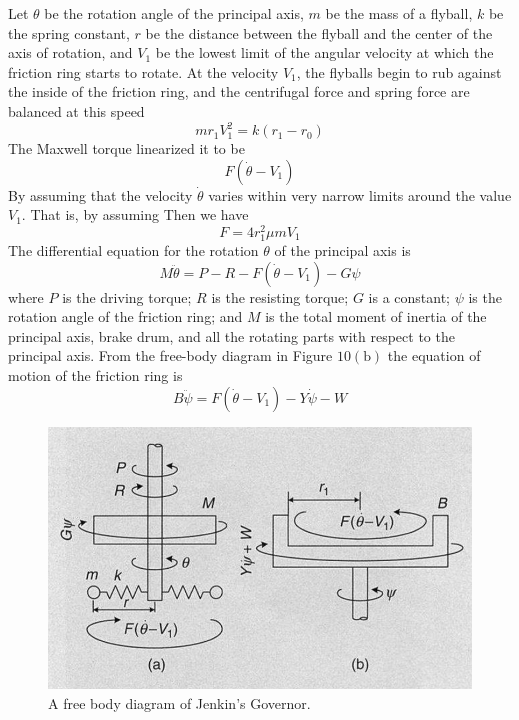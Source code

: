 \documentclass[11pt]{scrartcl} %
\begin{document}
Let $\theta$ be the rotation angle of the principal axis, $m$ be the mass of a flyball, $k$ be the spring constant, $r$ be the distance between the flyball and the center of the axis of rotation, and $V_{1}$ be the lowest limit of the angular velocity at which the friction ring starts to rotate. At the velocity $V_{1}$, the flyballs begin to rub against the inside of the friction ring, and the centrifugal force and spring force are balanced at this speed
\begin{equation}m r_{1} V_{1}^{2}=k\left(r_{1}-r_{0}\right)\end{equation}
The Maxwell torque linearized it to be
\begin{equation}F\left(\dot{\theta}-V_{1}\right)\end{equation}
By assuming that the velocity $\dot{\theta}$ varies within very narrow limits around the value $V_{1} .$ That is, by assuming
Then we have
\begin{equation}F=4 r_{1}^{2} \mu m V_{1}\end{equation}
The differential equation for the rotation $\theta$ of the principal axis is
\begin{equation}M \ddot{\theta}=P-R-F\left(\dot{\theta}-V_{1}\right)-G \psi\end{equation}
where $P$ is the driving torque; $R$ is the resisting torque; $G$ is a constant; $\psi$ is the rotation angle of the friction ring; and $M$ is the total moment of inertia of the principal axis, brake drum, and all the rotating parts with respect to the principal axis. From the free-body diagram in Figure $10(\mathrm{b})$ the equation of motion of the friction ring is
\begin{equation}B \ddot{\psi}=F\left(\dot{\theta}-V_{1}\right)-Y \dot{\psi}-W\end{equation}

\begin{figure}[h] %
	\centering
	\includegraphics[width=0.5\columnwidth]{images/p2.JPG} %
	\caption{A free body diagram of Jenkin's Governor.}
\end{figure}
\end{document}
